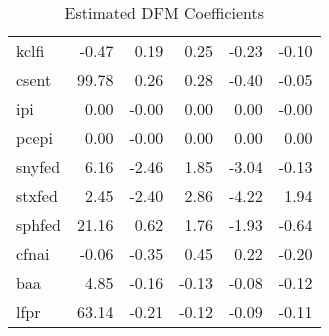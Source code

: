 \documentclass[11pt, letterpaper]{article}\usepackage[]{graphicx}\usepackage[]{color}
\begin{document}
\begin{table}[H]
\begin{tabular}{lrrrrr}
  kclfi & -0.47 & 0.19 & 0.25 & -0.23 & -0.10 \\ 
  csent & 99.78 & 0.26 & 0.28 & -0.40 & -0.05 \\ 
  ipi & 0.00 & -0.00 & 0.00 & 0.00 & -0.00 \\ 
  pcepi & 0.00 & -0.00 & 0.00 & 0.00 & 0.00 \\ 
  snyfed & 6.16 & -2.46 & 1.85 & -3.04 & -0.13 \\ 
  stxfed & 2.45 & -2.40 & 2.86 & -4.22 & 1.94 \\ 
  sphfed & 21.16 & 0.62 & 1.76 & -1.93 & -0.64 \\ 
  cfnai & -0.06 & -0.35 & 0.45 & 0.22 & -0.20 \\ 
  baa & 4.85 & -0.16 & -0.13 & -0.08 & -0.12 \\ 
  lfpr & 63.14 & -0.21 & -0.12 & -0.09 & -0.11 \\ 
   \hline
\end{tabular}
\endgroup
\caption{Estimated DFM Coefficients} 
\end{table}
\end{document}

